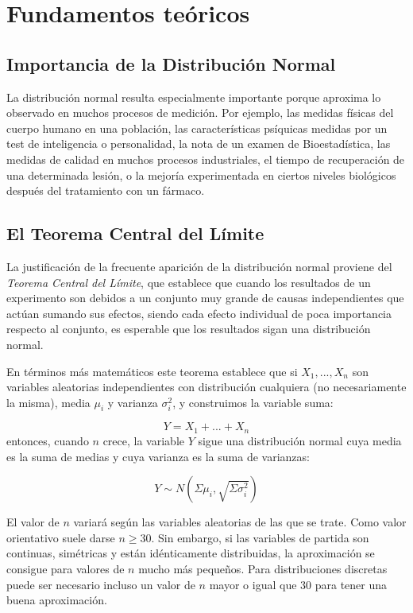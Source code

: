 \documentclass[a4paper]{article}
\begin{document}
\sloppy


\bigskip
\section*{Fundamentos teóricos}
\subsection*{Importancia de la Distribución Normal}
La distribución normal resulta especialmente importante porque
aproxima lo observado en muchos procesos de medición. Por ejemplo,
las medidas físicas del cuerpo humano en una población, las
características psíquicas medidas por un test de inteligencia o
personalidad, la nota de un examen de Bioestadística, las medidas
de calidad en muchos procesos industriales, el tiempo de
recuperación de una determinada lesión, o la mejoría experimentada
en ciertos niveles biológicos después del tratamiento con un
fármaco.

\subsection*{El Teorema Central del Límite}
La justificación de la frecuente aparición de la distribución
normal proviene del \emph{Teorema Central del Límite}, que
establece que cuando los resultados de un experimento son debidos
a un conjunto muy grande de causas independientes que actúan
sumando sus efectos, siendo cada efecto individual de poca
importancia respecto al conjunto, es esperable que los resultados
sigan una distribución normal.

En términos más matemáticos este teorema establece que si
$X_{1},...,X_{n}$ son variables aleatorias independientes con
distribución cualquiera (no necesariamente la misma), media
$\mu_{i}$ y varianza $\sigma_{i}^{2}$, y construimos la variable
suma:

\[
Y = X_1  + ... + X_n
\]
entonces, cuando $n$ crece, la variable $Y$ sigue una distribución
normal cuya media es la suma de medias y cuya varianza es la suma
de varianzas:

\[
Y \sim N\left( {\Sigma \mu _i ,\sqrt {\Sigma \sigma _i ^2 } }
\right)
\]

El valor de $n$ variará según las variables aleatorias de las que
se trate. Como valor orientativo suele darse $n \geq 30$. Sin
embargo, si las variables de partida son continuas, simétricas y
están idénticamente distribuidas, la aproximación se consigue para
valores de $n$ mucho más pequeños. Para distribuciones discretas
puede ser necesario incluso un valor de $n$ mayor o igual que 30
para tener una buena aproximación.
\end{document}
